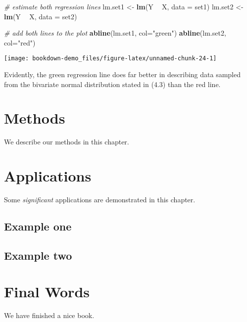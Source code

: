 \documentclass[]{book}
\newenvironment{Shaded}{\begin{snugshade}}{\end{snugshade}}
\newcommand{\KeywordTok}[1]{\textcolor[rgb]{0.13,0.29,0.53}{\textbf{#1}}}
\newcommand{\DataTypeTok}[1]{\textcolor[rgb]{0.13,0.29,0.53}{#1}}
\newcommand{\StringTok}[1]{\textcolor[rgb]{0.31,0.60,0.02}{#1}}
\newcommand{\CommentTok}[1]{\textcolor[rgb]{0.56,0.35,0.01}{\textit{#1}}}
\newcommand{\OperatorTok}[1]{\textcolor[rgb]{0.81,0.36,0.00}{\textbf{#1}}}
\newcommand{\NormalTok}[1]{#1}
\theoremstyle{definition}
\theoremstyle{definition}
\theoremstyle{definition}
\theoremstyle{remark}
\begin{document}
\begin{Shaded}
\begin{Highlighting}[]
\CommentTok{# estimate both regression lines}
\NormalTok{lm.set1 <-}\StringTok{ }\KeywordTok{lm}\NormalTok{(Y }\OperatorTok{~}\StringTok{ }\NormalTok{X, }\DataTypeTok{data =}\NormalTok{ set1)}
\NormalTok{lm.set2 <-}\StringTok{ }\KeywordTok{lm}\NormalTok{(Y }\OperatorTok{~}\StringTok{ }\NormalTok{X, }\DataTypeTok{data =}\NormalTok{ set2)}

\CommentTok{# add both lines to the plot}
\KeywordTok{abline}\NormalTok{(lm.set1, }\DataTypeTok{col=}\StringTok{"green"}\NormalTok{)}
\KeywordTok{abline}\NormalTok{(lm.set2, }\DataTypeTok{col=}\StringTok{"red"}\NormalTok{)}
\end{Highlighting}
\end{Shaded}

\begin{center}\texttt{[image: bookdown-demo\_files/figure-latex/unnamed-chunk-24-1]} \end{center}

Evidently, the green regression line does far better in describing data
sampled from the bivariate normal distribution stated in (4.3) than the
red line.

\chapter{Methods}\label{methods}

We describe our methods in this chapter.

\chapter{Applications}\label{applications}

Some \emph{significant} applications are demonstrated in this chapter.

\section{Example one}\label{example-one}

\section{Example two}\label{example-two}

\chapter{Final Words}\label{final-words}

We have finished a nice book.


\end{document}

